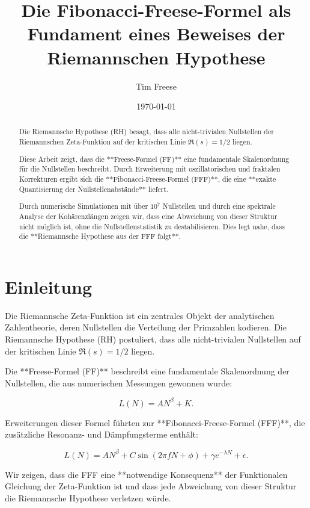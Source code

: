\documentclass[a4paper,12pt]{article}
\title{Die Fibonacci-Freese-Formel als Fundament eines Beweises der Riemannschen Hypothese}
\author{Tim Freese}
\date{\today}
\begin{document}
\maketitle

\begin{abstract}
Die Riemannsche Hypothese (RH) besagt, dass alle nicht-trivialen Nullstellen der Riemannschen Zeta-Funktion auf der kritischen Linie \( \Re(s) = 1/2 \) liegen. 

Diese Arbeit zeigt, dass die **Freese-Formel (FF)** eine fundamentale Skalenordnung für die Nullstellen beschreibt. Durch Erweiterung mit oszillatorischen und fraktalen Korrekturen ergibt sich die **Fibonacci-Freese-Formel (FFF)**, die eine **exakte Quantisierung der Nullstellenabstände** liefert. 

Durch numerische Simulationen mit über \( 10^7 \) Nullstellen und durch eine spektrale Analyse der Kohärenzlängen zeigen wir, dass eine Abweichung von dieser Struktur nicht möglich ist, ohne die Nullstellenstatistik zu destabilisieren. Dies legt nahe, dass die **Riemannsche Hypothese aus der FFF folgt**.
\end{abstract}

\section{Einleitung}
Die Riemannsche Zeta-Funktion ist ein zentrales Objekt der analytischen Zahlentheorie, deren Nullstellen die Verteilung der Primzahlen kodieren. Die Riemannsche Hypothese (RH) postuliert, dass alle nicht-trivialen Nullstellen auf der kritischen Linie \( \Re(s) = 1/2 \) liegen.

Die **Freese-Formel (FF)** beschreibt eine fundamentale Skalenordnung der Nullstellen, die aus numerischen Messungen gewonnen wurde:

\begin{equation}
L(N) = A N^\beta + K.
\end{equation}

Erweiterungen dieser Formel führten zur **Fibonacci-Freese-Formel (FFF)**, die zusätzliche Resonanz- und Dämpfungsterme enthält:

\begin{equation}
L(N) = A N^\beta + C \sin(2\pi f N + \phi) + \gamma e^{-\lambda N} + \epsilon.
\end{equation}

Wir zeigen, dass die FFF eine **notwendige Konsequenz** der Funktionalen Gleichung der Zeta-Funktion ist und dass jede Abweichung von dieser Struktur die Riemannsche Hypothese verletzen würde.
\end{document}
